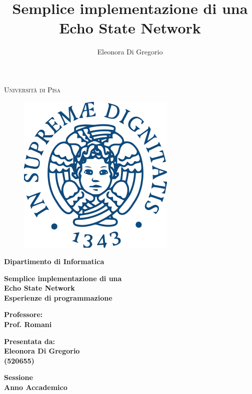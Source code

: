 \documentclass[12pt,titlepage]{report}
\title{Semplice implementazione di una\\ Echo State Network}
\author{Eleonora Di Gregorio}
\begin{document}
\baselineskip 18pt

\begin{titlepage}
	\begin{center}
		{{\Large{\textsc{Universit\`a di Pisa\\}}}}
	\begin{figure}[h!]
		\centering 
		\includegraphics[width=0.3\linewidth]{immagini/Stemma_unipi.png}
	\end{figure}	
		{\bf Dipartimento di Informatica}
	\end{center}
	\vspace{12mm}
	\begin{center}
		{\LARGE{\bf Semplice implementazione di una}}\\
		\vspace{3mm}
		{\LARGE{\bf Echo State Network}}\\
		\vspace{12mm} {\large{\bf Esperienze di programmazione}}
	\end{center}
	\vspace{12mm}
	\par
	\noindent
	\begin{minipage}[t]{0.47\textwidth}
		{\large{\bf Professore:\\
				Prof. Romani\\}}
	\end{minipage}
	\hfill
	\begin{minipage}[t]{0.47\textwidth}\raggedleft
		{\large{\bf Presentata da:\\
				Eleonora Di Gregorio \\
				(520655)}}
	\end{minipage}
	\vspace{20mm}
	\begin{center}
		{\large{\bf Sessione\\%
				Anno Accademico }}%
	\end{center}
\end{titlepage}
\end{document}
